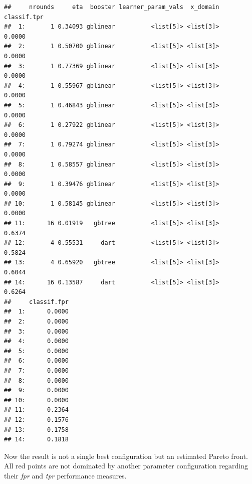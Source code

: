 \documentclass[
]{scrbook}
\newenvironment{Shaded}{\begin{snugshade}}{\end{snugshade}}
\newcommand{\NormalTok}[1]{#1}
\newcommand{\SpecialCharTok}[1]{\textcolor[rgb]{0.00,0.00,0.00}{#1}}
\renewenvironment{Shaded} {\begin{snugshade}\small} {\end{snugshade}}
\begin{document}
\begin{verbatim}
##     nrounds     eta  booster learner_param_vals  x_domain classif.tpr
##  1:       1 0.34093 gblinear          <list[5]> <list[3]>      0.0000
##  2:       1 0.50700 gblinear          <list[5]> <list[3]>      0.0000
##  3:       1 0.77369 gblinear          <list[5]> <list[3]>      0.0000
##  4:       1 0.55967 gblinear          <list[5]> <list[3]>      0.0000
##  5:       1 0.46843 gblinear          <list[5]> <list[3]>      0.0000
##  6:       1 0.27922 gblinear          <list[5]> <list[3]>      0.0000
##  7:       1 0.79274 gblinear          <list[5]> <list[3]>      0.0000
##  8:       1 0.58557 gblinear          <list[5]> <list[3]>      0.0000
##  9:       1 0.39476 gblinear          <list[5]> <list[3]>      0.0000
## 10:       1 0.58145 gblinear          <list[5]> <list[3]>      0.0000
## 11:      16 0.01919   gbtree          <list[5]> <list[3]>      0.6374
## 12:       4 0.55531     dart          <list[5]> <list[3]>      0.5824
## 13:       4 0.65920   gbtree          <list[5]> <list[3]>      0.6044
## 14:      16 0.13587     dart          <list[5]> <list[3]>      0.6264
##     classif.fpr
##  1:      0.0000
##  2:      0.0000
##  3:      0.0000
##  4:      0.0000
##  5:      0.0000
##  6:      0.0000
##  7:      0.0000
##  8:      0.0000
##  9:      0.0000
## 10:      0.0000
## 11:      0.2364
## 12:      0.1576
## 13:      0.1758
## 14:      0.1818
\end{verbatim}

Now the result is not a single best configuration but an estimated Pareto front.
All red points are not dominated by another parameter configuration regarding their \emph{fpr} and \emph{tpr} performance measures.

\begin{Shaded}
\end{Shaded}
\end{document}
